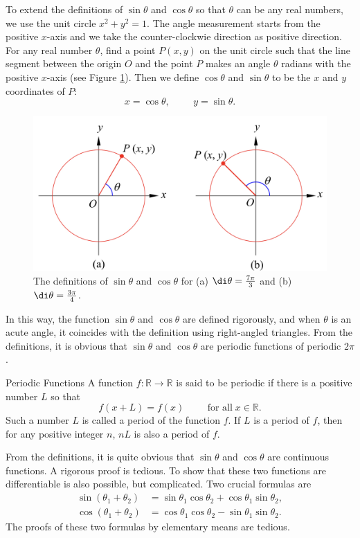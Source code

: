To extend the definitions of $\sin\theta$ and $\cos\theta$ so that $\theta$ can be any real numbers, we use the unit circle $x^2+y^2=1$. 
The angle measurement starts from the positive $x$-axis and we take the counter-clockwie direction as positive direction. 
For any real number $\theta$, 
find a point $P(x, y)$ on the unit circle such that the line segment between the origin $O$ and the point $P$ makes an angle $\theta$ radians with the positive $x$-axis (see Figure \ref{figure31}). Then we define $\cos\theta$ and $\sin\theta$ to be the $x$ and $y$ coordinates of $P$:
\[x=\cos\theta, \hspace{1cm} y=\sin\theta.\]

\begin{figure}[ht]
\centering
\includegraphics[scale=0.2]{Picture31.png}
\caption{The definitions of $\sin\theta$ and $\cos\theta$ for   (a)  $\di \theta=\frac{7\pi}{3}$ and  (b)  $\di\theta =\frac{3\pi}{4}$.\fa}\label{figure31}
\end{figure}
In this way, the function $\sin\theta$ and $\cos\theta$ are defined rigorously, and when $\theta$ is an acute angle, it coincides with the definition using right-angled triangles. From the definitions, it is obvious that $\sin\theta$ and $\cos\theta$ are periodic functions of periodic $2\pi$.

\begin{definition}{Periodic Functions}
A   function $f:\mathbb{R}\to\mathbb{R}$ is said to be periodic if there is a positive number $L$ so that
\[f(x+L)=f(x)\hspace{1cm}\text{for all}\; x\in \mathbb{R}.\]
Such a number $L$ is called a period of the function $f$. If $L$ is a period of $f$, then for any positive integer $n$, $nL$ is also a period of $f$.
\end{definition}

From the definitions, it is quite obvious that $\sin\theta$ and $\cos\theta$ are continuous functions. A rigorous proof is tedious. To show that these two functions are differentiable is also possible, but complicated. Two crucial formulas are
\begin{subequations}\label{eq230218_6}
\begin{align}
\sin(\theta_1+\theta_2)&=\sin\theta_1\cos\theta_2+\cos\theta_1\sin\theta_2,\label{eq230218_6a}\\
\cos(\theta_1+\theta_2)&=\cos\theta_1\cos\theta_2-\sin\theta_1\sin\theta_2.\label{eq230218_6b}
\end{align}\end{subequations}The proofs of these two formulas by elementary means are tedious.

